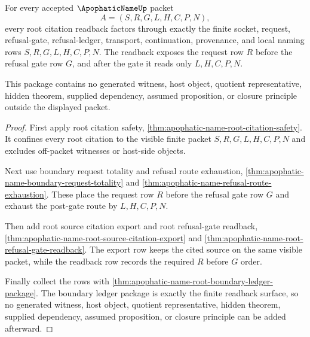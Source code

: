 \begin{theorem}
\label{thm:apophatic-name-root-citation-readback-package}
For every accepted $\ApophaticNameUp$ packet
$$
A=(S,R,G,L,H,C,P,N),
$$
every root citation readback factors through exactly the finite socket, request, refusal-gate, refusal-ledger, transport, continuation, provenance, and local naming rows $S,R,G,L,H,C,P,N$. The readback exposes the request row $R$ before the refusal gate row $G$, and after the gate it reads only $L,H,C,P,N$.

This package contains no generated witness, host object, quotient representative, hidden theorem, supplied dependency, assumed proposition, or closure principle outside the displayed packet.
\end{theorem}
\begin{proof}
First apply root citation safety, \autoref{thm:apophatic-name-root-citation-safety}. It confines every root citation to the visible finite packet $S,R,G,L,H,C,P,N$ and excludes off-packet witnesses or host-side objects.

Next use boundary request totality and refusal route exhaustion, \autoref{thm:apophatic-name-boundary-request-totality} and \autoref{thm:apophatic-name-refusal-route-exhaustion}. These place the request row $R$ before the refusal gate row $G$ and exhaust the post-gate route by $L,H,C,P,N$.

Then add root source citation export and root refusal-gate readback, \autoref{thm:apophatic-name-root-source-citation-export} and \autoref{thm:apophatic-name-root-refusal-gate-readback}. The export row keeps the cited source on the same visible packet, while the readback row records the required $R$ before $G$ order.

Finally collect the rows with \autoref{thm:apophatic-name-root-boundary-ledger-package}. The boundary ledger package is exactly the finite readback surface, so no generated witness, host object, quotient representative, hidden theorem, supplied dependency, assumed proposition, or closure principle can be added afterward.
\end{proof}

